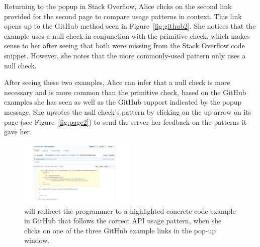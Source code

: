 Returning to the popup in Stack Overflow, Alice clicks on the second link provided for the second page to compare usage patterns in context. This link opens up to the GitHub method seen in Figure~\ref{fig:github2}. She notices that the example uses a null check in conjunction with the primitive check, which makes sense to her after seeing that both were missing from the Stack Overflow code snippet. However, she notes that the more commonly-used pattern only uses a null check.

After seeing these two examples, Alice can infer that a null check is more necessary and is more common than the primitive check, based on the GitHub examples she has seen as well as the GitHub support indicated by the popup message. She upvotes the null check's pattern by clicking on the up-arrow on its page (see Figure~\ref{fig:page2}) to send the server her feedback on the patterns it gave her.

\begin{figure}
\centering
\includegraphics[width=0.5\textwidth]{github-example.pdf}
  \vspace{.1in}
  \caption{{\tool} will redirect the programmer to a highlighted concrete code example in GitHub that follows the correct API usage pattern, when she clicks on one of the three GitHub example links in the pop-up window.\protect\footnotemark}
  \label{fig:github}
\end{figure}



